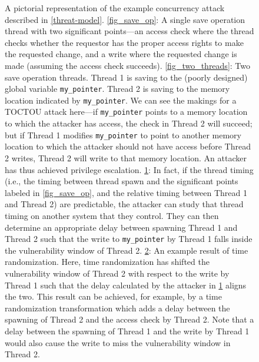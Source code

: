 \begin{figure}
\begin{subfigure}{\columnwidth}
		\caption{}
		\label{fig_attack}
	\end{subfigure}
	\begin{subfigure}{\columnwidth}
		\caption{}
		\label{fig_thwart}
	\end{subfigure}
	\caption{
		A pictorial representation of the example concurrency attack described in \autoref{threat-model}.
		\ref{fig_save_op}: A single save operation thread with two significant points---an access check where the thread checks whether the requestor has the proper access rights to make the requested change, and a write where the requested change is made (assuming the access check succeeds).
		\ref{fig_two_threads}: Two save operation threads.
		Thread 1 is saving to the (poorly designed) global variable \texttt{my\_pointer}.
		Thread 2 is saving to the memory location indicated by \texttt{my\_pointer}.
		We can see the makings for a TOCTOU attack here---if \texttt{my\_pointer} points to a memory location to which the attacker has access, the check in Thread 2 will succeed; but if Thread 1 modifies \texttt{my\_pointer} to point to another memory location to which the attacker should not have access before Thread 2 writes, Thread 2 will write to that memory location.
		An attacker has thus achieved privilege escalation.
		\ref{fig_attack}: In fact, if the thread timing (i.e., the timing between thread spawn and the significant points labeled in \ref{fig_save_op}, and the relative timing between Thread 1 and Thread 2) are predictable, the attacker can study that thread timing on another system that they control.
		They can then determine an appropriate delay between spawning Thread 1 and Thread 2 such that the write to \texttt{my\_pointer} by Thread 1 falls inside the vulnerability window of Thread 2.
		\ref{fig_thwart}: An example result of time randomization.
		Here, time randomization has shifted the vulnerability window of Thread 2 with respect to the write by Thread 1 such that the delay calculated by the attacker in \ref{fig_attack} aligns the two.
		This result can be achieved, for example, by a time randomization transformation which adds a delay between the spawning of Thread 2 and the access check by Thread 2.
		Note that a delay between the spawning of Thread 1 and the write by Thread 1 would also cause the write to miss the vulnerability window in Thread 2.
	}
	\label{fig_exploitation}
\end{figure}
